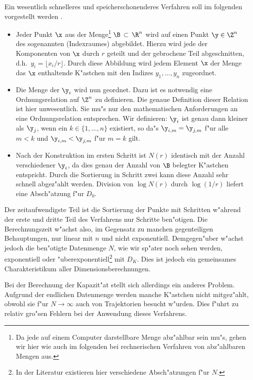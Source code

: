 Ein wesentlich schnelleres und speicherschonenderes Verfahren soll im folgenden
vorgestellt werden \cite{Junglas}.
\begin{itemize}
\item Jeder Punkt $\x$ aus der Menge\footnote{Da jede auf einem
Computer darstellbare Menge abz"ahlbar sein mu"s, gehen wir hier wie auch im folgenden bei 
rechnerischen Verfahren von abz"ahlbaren Mengen aus.} $\B\,\subset\,\R^n$ wird auf einen
Punkt $\y\in\Z^n$ des sogenannten \begriff(Indexraumes)  abgebildet. Hierzu wird jede
der Komponenten von $\x$ durch $r$ geteilt und der gebrochene Teil abgeschnitten,
d.h.\  $y_i=\lfloor x_i/r \rfloor$. Durch diese Abbildung wird jedem Element $\x$ der
Menge das $\x$ enthaltende K"astchen mit den Indizes $y_1,\dots,y_n$ zugeordnet.
\item Die Menge der $\y_i$ wird nun geordnet. Dazu ist es notwendig eine Ordnungsrelation
auf $\Z^n$ zu definieren. Die genaue Definition dieser Relation ist hier unwesentlich. Sie mu"s nur den
mathematischen Anforderungen an eine Ordnungsrelation entsprechen. Wir definieren: $\y_i$
ist genau dann kleiner als $\y_j$, wenn ein $k\in\{1,\dots,n\}$ existiert, so da"s
$\y_{i,m}=\y_{j,m}$ f"ur alle $m<k$ und $\y_{i,m}<\y_{j,m}$ f"ur $m=k$ gilt. 
\item Nach der Konstruktion im ersten Schritt ist $N(r)$ identisch mit der Anzahl
verschiedener $\y_i$, da dies genau der Anzahl von $\B$ belegter K"astchen
entspricht. Durch die Sortierung in Schritt zwei kann diese Anzahl sehr schnell abgez"ahlt 
werden. Division von $\log N(r)$ durch $\log(1/r)$ liefert eine Absch"atzung f"ur $D_0$.
\end{itemize}
Der zeitaufwendigste Teil ist die Sortierung der Punkte mit  Schritten
w"ahrend der erste und dritte Teil des Verfahrens nur  Schritte ben"otigen. 
Die Berechnungszeit w"achst also, im Gegensatz zu manchen gegenteiligen Behauptungen,
nur linear mit $n$ und nicht exponentiell. Demgegen"uber w"achst jedoch die
ben"otigte Datenmenge $N$, wie wir sp"ater noch sehen werden, exponentiell oder
"uberexponentiell\footnote{In der Literatur existieren hier verschiedene Absch"atzungen
f"ur $N$.} mit $D_K$. Dies ist jedoch ein gemeinsames Charakteristikum
aller Dimensionsberechnungen.

Bei der Berechnung der Kapazit"at stellt sich allerdings ein anderes Problem. Aufgrund der
endlichen Datenmenge werden manche K"astchen nicht mitgez"ahlt, obwohl sie f"ur
$N\to\infty$ auch von Trajektorien besucht w"urden. Dies f"uhrt zu relativ gro"sen Fehlern 
bei der Anwendung dieses Verfahrens. 

